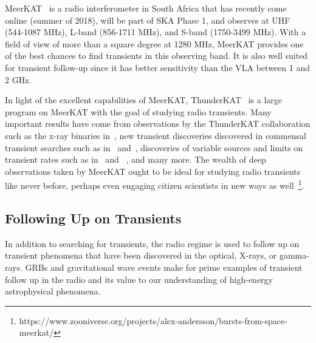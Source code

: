 \documentclass[12pt]{article}
\begin{document}
MeerKAT~\citep{2016mks..confE...1J} is a radio interferometer in South Africa that has recently come online (summer of 2018), will be part of SKA Phase 1, and observes at UHF (544-1087 MHz), L-band (856-1711 MHz), and S-band (1750-3499 MHz). With a field of view of more than a square degree at 1280 MHz, MeerKAT provides one of the best chances to find transients in this observing band. It is also well suited for transient follow-up since it has better sensitivity than the VLA between 1 and 2 GHz. 

In light of the excellent capabilities of MeerKAT, ThunderKAT~\citep{2016mks..confE..13W} is a large program on MeerKAT with the goal of studying radio transients. Many important results have come from observations by the ThunderKAT collaboration such as the x-ray binaries in~\citet{2020NatAs...4..697B}, new transient discoveries discovered in commensal transient searches such as in~\citet{2020MNRAS.491..560D} and~\citet{2022MNRAS.513.3482A}, discoveries of variable sources and limits on transient rates such as in~\citet{2022MNRAS.517.2894R} and ~\citet{commensal1}, and many more. The wealth of deep observations taken by MeerKAT ought to be ideal for studying radio transients like never before, perhaps even engaging citizen scientists in new ways as well~\footnote{https://www.zooniverse.org/projects/alex-andersson/bursts-from-space-meerkat/}.

\subsection{Following Up on Transients}
In addition to searching for transients, the radio regime is used to follow up on transient phenomena that have been discovered in the optical, X-rays, or gamma-rays. GRBs and gravitational wave events make for prime examples of transient follow up in the radio and its value to our understanding of high-energy astrophysical phenomena. 
\end{document}
